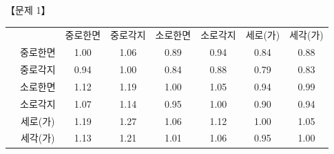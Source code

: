 \begin{longquestion}{【문제 1】}
{\small\centering
\begin{tabular}{|c|c|c|c|c|c|c|c|}
\hline
{} &  & 중로한면 & 중로각지 & 소로한면 & 소로각지 & 세로(가) & 세각(가) \\
 & 중로한면 & 1.00 & 1.06 & 0.89 & 0.94 & 0.84 & 0.88 \\
 & 중로각지 & 0.94 & 1.00 & 0.84 & 0.88 & 0.79 & 0.83 \\
 & 소로한면 & 1.12 & 1.19 & 1.00 & 1.05 & 0.94 & 0.99 \\
 & 소로각지 & 1.07 & 1.14 & 0.95 & 1.00 & 0.90 & 0.94 \\
 & 세로(가) & 1.19 & 1.27 & 1.06 & 1.12 & 1.00 & 1.05 \\
 & 세각(가) & 1.13 & 1.21 & 1.01 & 1.06 & 0.95 & 1.00 \\
\hline
\end{tabular}\par}


\end{longquestion}
